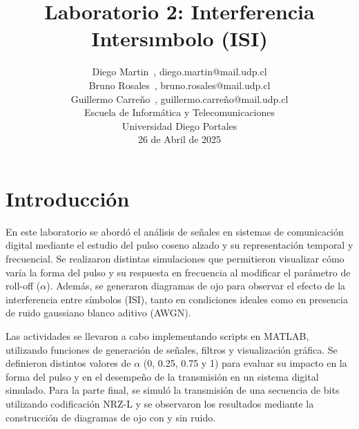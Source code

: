 \documentclass[lettersize,journal]{IEEEtran}
\begin{document}
\title{Laboratorio 2: Interferencia Intersımbolo (ISI)}

\author{
    Diego Martin~\IEEEmembership{}, diego.martin@mail.udp.cl \\
    Bruno Rosales~\IEEEmembership{}, bruno.rosales@mail.udp.cl \\
    Guillermo Carreño~\IEEEmembership{}, guillermo.carreño@mail.udp.cl \\
    Escuela de Informática y Telecomunicaciones\\
    Universidad Diego Portales

    26 de Abril de 2025
}





\maketitle


\section{Introducción}\label{sec:introduccion}

En este laboratorio se abordó el análisis de señales en sistemas de comunicación digital mediante el estudio del pulso coseno alzado y su representación temporal y frecuencial. Se realizaron distintas simulaciones que permitieron visualizar cómo varía la forma del pulso y su respuesta en frecuencia al modificar el parámetro de roll-off ($\alpha$). Además, se generaron diagramas de ojo para observar el efecto de la interferencia entre símbolos (ISI), tanto en condiciones ideales como en presencia de ruido gaussiano blanco aditivo (AWGN).

Las actividades se llevaron a cabo implementando scripts en MATLAB, utilizando funciones de generación de señales, filtros y visualización gráfica. Se definieron distintos valores de $\alpha$ (0, 0.25, 0.75 y 1) para evaluar su impacto en la forma del pulso y en el desempeño de la transmisión en un sistema digital simulado. Para la parte final, se simuló la transmisión de una secuencia de bits utilizando codificación NRZ-L y se observaron los resultados mediante la construcción de diagramas de ojo con y sin ruido.
\end{document}
